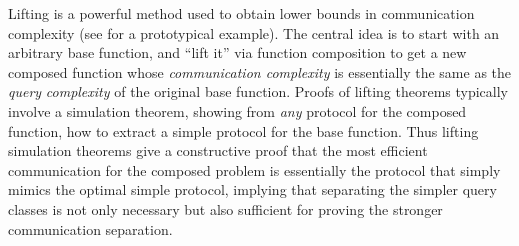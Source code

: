 \documentclass[11pt]{article}
\newcommand{\toni}[1]{\footnote{{\bf\color{blue} toni}: {#1}}}
\newcommand{\B}{\{0,1\}}
\begin{document}
Lifting is a powerful method used to obtain lower bounds in communication complexity (see \cite{lifting} for a prototypical example). 
The central idea is to start with an arbitrary base function,
and ``lift it'' via function composition to get a new composed
function whose {\it communication complexity} is essentially the same as the
{\it query} {\it complexity} of the original base function.
Proofs of lifting theorems typically involve a simulation theorem, showing
from {\it any} protocol for the composed function,
how to extract a simple protocol for the base function. 
Thus lifting simulation theorems give a constructive proof
that the most efficient communication for the composed problem is essentially the protocol that simply mimics the optimal simple protocol, implying that separating  the simpler query classes is not only necessary but also sufficient for proving the  stronger communication separation.

\end{document}
